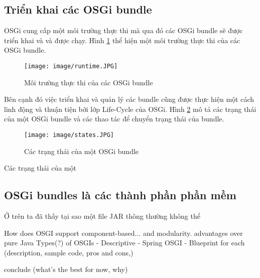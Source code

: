 \subsection{Triển khai các OSGi bundle}
OSGi cung cấp một môi trường thực thi mà qua đó các OSGi bundle sẽ được triển khai và và được chạy. Hình \ref{fig:runtime} thể hiện một môi trường thực thi của các OSGi bundle.
\begin{figure}[htbp]
	\centering
		\texttt{[image: image/runtime.JPG]}
	\caption{Môi trường thực thi của các OSGi bundle}
	\label{fig:runtime}
\end{figure}
Bên cạnh đó việc triển khai và quản lý các bundle cũng được thực hiện một cách linh động và thuận tiện bởi lớp Life-Cycle của OSGi. Hình \ref{fig:states} mô tả các trạng thái của một OSGi bundle và các thao tác để chuyển trạng thái của bundle.
\begin{figure}[hbtp]
	\centering
		\texttt{[image: image/states.JPG]}
	\caption{Các trạng thái của một OSGi bundle}
	\label{fig:states}
\end{figure}

Các trạng thái của một 

\subsection{OSGi bundles là các thành phần phần mềm}
Ở trên ta đã thấy tại sao một file JAR thông thường không thể 

 How does OSGI support component-based... and modularity.
advantages over pure Java
 Types(?) of OSGIs
- Descriptive
- Spring OSGI
- Blueprint
for each (description, sample code, pros and cons,)

conclude (what's the best for now, why)
